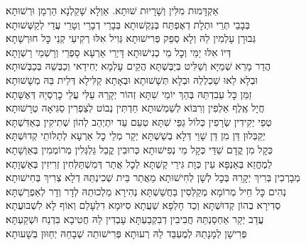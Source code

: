 \documentclass[twoside, openany, parskip=half, 11pt]{book}
\begin{document}
\begin{footnotesize}

\shatz
אַקְדָּמוּת מִלִּין וְשָׁרָיוּת שׁוּתָא. אַוְלָא שָׁקֵלְנָא הַרְמָן וּרְשׁוּתָא׃\\
\kahal
בְּבָבֵי תְּרֵי וּתְלָת דְאֶפְתַּח בְּנַקְשׁוּתָא בְּבָרֵי דְבָרֵי וְטָרֵי עֲדֵי לְקַשְּׁשׁוּתָא׃\\
\shatz
גְּבוּרָן עָלְמִין לֵהּ וְלָא סְפֵק פְּרִישׁוּתָא גְּוִיל אִלּוּ רְקִיעֵי קְנֵי כׇּל חוּרְשָׁתָא׃\\
\kahal
דְּיוֹ אִלּוּ יַמֵּי וְכׇל מֵי כְנִישׁוּתָא דָּיְרֵי אַרְעָא סָפְרֵי וְרָשְׁמֵי רַשְׁוָתָא׃\\
\shatz
הֲדַר מָרֵא שְׁמַיָּא וְשַׁלִּיט בְּיַבֶּשְׁתָּא הֲקֵים עָלְמָא יְחִידַאי וְכַבְּשֵׁהּ בְּכַבְּשׁוּתָא׃\\
\kahal
וּבְלָא לֵאוּ שַׁכְלְלֵהּ וּבְלָא תְּשָׁשׁוּתָא וּבְאָתָא קַלִּילָא דְּלֵית בַּהּ מְשָׁשׁוּתָא׃\\
\shatz
זַמֵּן כׇּל עַבִדְתֵּהּ בְּהַךְ יוֹמֵי שִׁתָּא זְהוֹר יְקָרֵהּ עַלִּי עֲלֵי כׇרְסְיֵהּ דְּאֶשָּׁתָא׃\\
\kahal
חֲיָל אֶֽלֶף אַלְפִין וְרִבּוֹא לְשַׁמְשׁוּתָא חַדְתִּין נְבוֹט לְצַפְרִין סַגִּיאָה טְרָשׁוּתָא׃\\
\shatz
טְפֵי יְקִידִין שְׂרָפִין כְּלוֹל גַפֵּי שִׁתָּא טְעֵם עַד יִתְיְהֵב לְהוֹן שְׁתִיקִין בְּאַדִּשְׁתָּא׃\\
\kahal
יְקַבְּלוּן דֵּן מִן דֵּן שָׁוֵי דְּלָא בְשַׁשְׁתָּא יְקַר מְלֵי כׇל אַרְעָא לְתַלּוֹתֵי קְדוּשְׁתָּא׃\\
\shatz
כְּקָל מִן קֳדָם שַׁדַּי כְּקָל מֵי נְפִישׁוּתָא כְּרוּבִין קֳבֵל גַּלְגְּלִין מְרוֹמְמִין בְּאַוְשָׁתָא׃\\
\kahal
לְמֶחֱזֵא בְּאַנְפָּא עֵין כְּוָת גִּירֵי קַשְׁתָּא לְכׇל אֲתַר דְּמִשְׁתַּלְּחִין זְרִיזִין בְּאַשְׁוָתָא׃\\
\shatz
מְבָרְכִין בְּרִיךְ יְקָרֵהּ בְּכׇל לְשָׁן לְחִישׁוּתָא מֵאֲתַר בֵּית שְׁכִינְתֵּהּ דְלָא צְרִיךְ בְּחִישׁוּתָא׃\\
\kahal
נְהִים כׇּל חֵיל מְרוֹמָא מְקַלְּסִין בַּחֲשַׁשְׁתָּא נְהִירָא מַלְכוּתֵהּ לְדָר וְדָר לְאַפְרַשְׁתָּא׃\\
\shatz
סְדִירָא בְהוֹן קְדוּשְׁתָּא וְכַד חָלְפָא שַׁעֲתָא סִיּוּמָא דִלְעָלַם וְאוֹף לָא לִשְׁבוּעֲתָא׃\\
\kahal
עֲדַב יְקַר אַחְסַנְתֵּהּ חֲבִיבִין דְבִקְבַעְתָּא עָבְדִין לֵהּ חֲטִיבָא בִּדְנַח וּשְׁקַעְתָּא׃\\
\shatz
פְּרִישָׁן לְמָנָתֵהּ לְמֶעְבַּד לֵהּ רְעוּתָא פְּרִישׁוּתֵה שְׁבָחֵהּ יְחַוּוּן בְּשָׁעוּתָא׃\\

\end{footnotesize}
\end{document}
